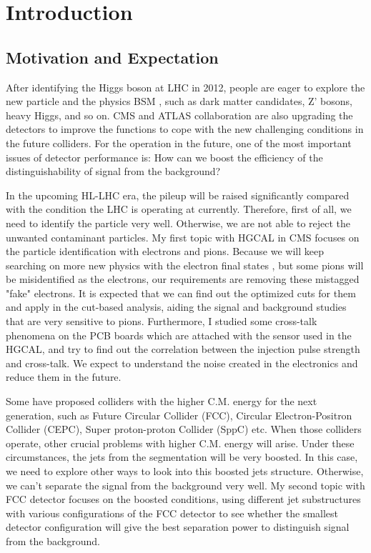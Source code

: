 \section{Introduction}
\subsection{Motivation and Expectation}
After identifying the Higgs boson at LHC in 2012, people are eager to explore the new particle and the physics BSM , such as dark matter candidates, Z' bosons, heavy Higgs, and so on. CMS and ATLAS collaboration are also upgrading the detectors to improve the functions to cope with the new challenging conditions in the future colliders. For the operation in the future, one of the most important issues of detector performance is: How can we boost the efficiency of the distinguishability of signal from the background?

In the upcoming HL-LHC era, the pileup will be raised significantly compared with the condition the LHC is operating at currently. Therefore, first of all, we need to identify the particle very well. Otherwise, we are not able to reject the unwanted contaminant particles. My first topic with HGCAL in CMS focuses on the particle identification with electrons and pions. Because we will keep searching on more new physics with the electron final states , but some pions will be misidentified as the electrons, our requirements are removing these mistagged "fake" electrons. It is expected that we can find out the optimized cuts for them and apply in the cut-based analysis, aiding the signal and background studies that are very sensitive to pions. Furthermore, I studied some cross-talk phenomena on the PCB boards which are attached with the sensor used in the HGCAL, and try to find out the correlation between the injection pulse strength and cross-talk. We expect to understand the noise created in the electronics and reduce them in the future.

Some have proposed colliders with the higher C.M. energy for the next generation, such as Future Circular Collider (FCC), Circular Electron-Positron Collider (CEPC), Super proton-proton Collider (SppC) etc. When those colliders operate, other crucial problems with higher C.M. energy will arise. Under these circumstances, the jets from the segmentation will be very boosted. In this case, we need to explore other ways to look into this boosted jets structure. Otherwise, we can't separate the signal from the background very well. My second topic with FCC detector focuses on the boosted conditions, using different jet substructures with various configurations of the FCC detector to see whether the smallest detector configuration will give the best separation power to distinguish signal from the background.
